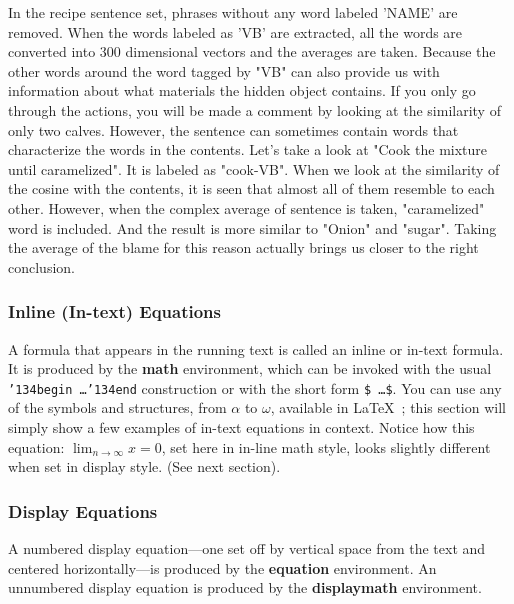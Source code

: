 In the recipe sentence set, phrases without any word labeled 'NAME' are removed. When the words labeled as 'VB' are extracted, all the words are converted into 300 dimensional vectors and the averages are taken. Because the other words around the word tagged by "VB" can also provide us with information about what materials the hidden object contains. If you only go through the actions, you will be made a comment by looking at the similarity of only two calves. However, the sentence can sometimes contain words that characterize the words in the contents. Let's take a look at "Cook the mixture until caramelized". It is labeled as "cook-VB". When we look at the similarity of the cosine with the contents, it is seen that almost all of them resemble to each other. However, when the complex average of sentence is taken, "caramelized" word is included. And the result is more similar to "Onion" and "sugar". Taking the average of the blame for this reason actually brings us closer to the right conclusion.

\subsubsection{Inline (In-text) Equations}
A formula that appears in the running text is called an
inline or in-text formula.  It is produced by the
\textbf{math} environment, which can be
invoked with the usual \texttt{{\char'134}begin\,\ldots{\char'134}end}
construction or with the short form \texttt{\$\,\ldots\$}. You
can use any of the symbols and structures,
from $\alpha$ to $\omega$, available in
\LaTeX~\cite{Lamport:LaTeX}; this section will simply show a
few examples of in-text equations in context. Notice how
this equation:
\begin{math}
  \lim_{n\rightarrow \infty}x=0
\end{math},
set here in in-line math style, looks slightly different when
set in display style.  (See next section).



\subsubsection{Display Equations}
A numbered display equation---one set off by vertical space from the
text and centered horizontally---is produced by the \textbf{equation}
environment. An unnumbered display equation is produced by the
\textbf{displaymath} environment.

